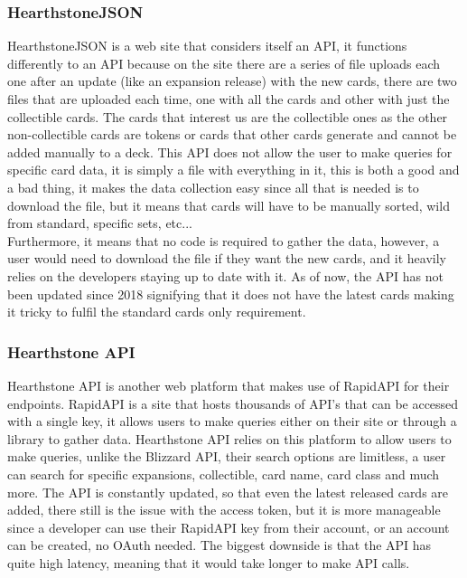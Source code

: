 \documentclass{report} %
\begin{document}
\subsubsection{HearthstoneJSON}
HearthstoneJSON is a web site that considers itself an API, it functions differently to an API because on the site there are a series of file uploads each one after an update (like an expansion release) with the new cards, there are two files that are uploaded each time, one with all the cards and other with just the collectible cards. The cards that interest us are the collectible ones as the other non-collectible cards are tokens or cards that other cards generate and cannot be added manually to a deck. This API does not allow the user to make queries for specific card data, it is simply a file with everything in it, this is both a good and a bad thing, it makes the data collection easy since all that is needed is to download the file, but it means that cards will have to be manually sorted, wild from standard, specific sets, etc... \\
\indent Furthermore, it means that no code is required to gather the data, however, a user would need to download the file if they want the new cards, and it heavily relies on the developers staying up to date with it. As of now, the API has not been updated since 2018 signifying that it does not have the latest cards making it tricky to fulfil the standard cards only requirement.

\subsubsection{Hearthstone API}
Hearthstone API is another web platform that makes use of RapidAPI for their endpoints. RapidAPI is a site that hosts thousands of API's that can be accessed with a single key, it allows users to make queries either on their site or through a library to gather data. Hearthstone API relies on this platform to allow users to make queries, unlike the Blizzard API, their search options are limitless, a user can search for specific expansions, collectible, card name, card class and much more. The API is constantly updated, so that even the latest released cards are added, there still is the issue with the access token, but it is more manageable  since a developer can use their RapidAPI key from their account, or an account can be created, no OAuth needed. The biggest downside is that the API has quite high latency, meaning that it would take longer to make API calls.
\end{document}
